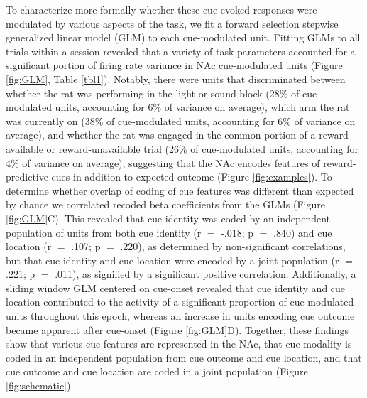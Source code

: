 \documentclass[11pt]{article}
\begin{document}
To characterize more formally whether these cue-evoked responses were modulated by various aspects of the task, we fit a forward selection stepwise generalized linear model (GLM) to each cue-modulated unit. Fitting GLMs to all trials within a session revealed that a variety of task parameters accounted for a significant portion of firing rate variance in NAc cue-modulated units (Figure \ref{fig:GLM}, Table \ref{tbl1}). Notably, there were units that discriminated between whether the rat was performing in the light or sound block (28\% of cue-modulated units, accounting for 6\% of variance on average), which arm the rat was currently on (38\% of cue-modulated units, accounting for 6\% of variance on average), and whether the rat was engaged in the common portion of a reward-available or reward-unavailable trial (26\% of cue-modulated units, accounting for 4\% of variance on average), suggesting that the NAc encodes features of reward-predictive cues in addition to expected outcome (Figure \ref{fig:examples}). To determine whether overlap of coding of cue features was different than expected by chance we correlated recoded beta coefficients from the GLMs (Figure \ref{fig:GLM}C). This revealed that cue identity was coded by an independent population of units from both cue identity (r $=$ -.018; p $=$ .840) and cue location (r $=$ .107; p $=$ .220), as determined by non-significant correlations, but that cue identity and cue location were encoded by a joint population (r $=$ .221; p $=$ .011), as signified by a significant positive correlation. Additionally, a sliding window GLM centered on cue-onset revealed that cue identity and cue location contributed to the activity of a significant proportion of cue-modulated units throughout this epoch, whereas an increase in units encoding cue outcome became apparent after cue-onset (Figure \ref{fig:GLM}D). Together, these findings show that various cue features are represented in the NAc, that cue modality is coded in an independent population from cue outcome and cue location, and that cue outcome and cue location are coded in a joint population (Figure \ref{fig:schematic}).
\end{document}
